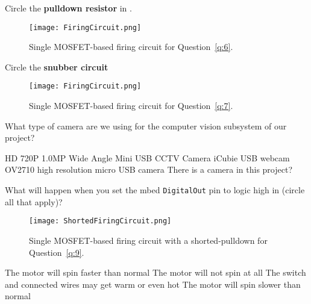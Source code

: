 \documentclass[addpoints,noanswers]{exam}
\begin{document}
\begin{questions}
\question[1]\label{q:6}
Circle the \textbf{pulldown resistor} in .
\begin{figure}[h]
\centering
	\texttt{[image: FiringCircuit.png]}
	\caption{Single MOSFET-based firing circuit for Question~\ref{q:6}.}
	\label{fig:FiringCircuitPulldown}
\end{figure}






\clearpage
\question[1]\label{q:7}
Circle the \textbf{snubber circuit} 
\begin{figure}[h]
\centering
	\texttt{[image: FiringCircuit.png]}
	\caption{Single MOSFET-based firing circuit for Question~\ref{q:7}.}
	\label{fig:FiringCircuitSnubber}
\end{figure}




\question[1]
What type of camera are we using for the computer vision subsystem of our project?
\begin{choices}
\choice HD 720P 1.0MP Wide Angle Mini USB CCTV Camera
\CorrectChoice iCubie USB webcam
\choice OV2710 high resolution micro USB camera
\choice There is a camera in this project?
\end{choices}







\question[1]\label{q:9}
What will happen when you set the mbed \lstinline{DigitalOut} pin to logic high in  (circle all that apply)?
\begin{figure}[h]
\centering
	\texttt{[image: ShortedFiringCircuit.png]}
	\caption{Single MOSFET-based firing circuit with a shorted-pulldown for Question~\ref{q:9}.}
	\label{fig:ShortedFiringCircuit}
\end{figure}
\begin{choices}
\choice The motor will spin faster than normal
\CorrectChoice The motor will not spin at all
\choice The switch and connected wires may get warm or even hot
\choice The motor will spin slower than normal 
\end{choices}






\end{questions}
\end{document}
